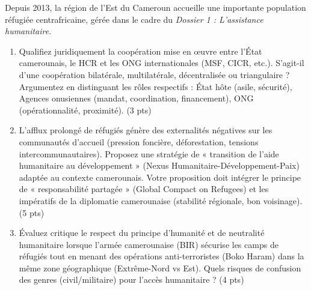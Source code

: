 \documentclass[11pt]{article}
\begin{document}
\begin{exercice}
Depuis 2013, la région de l'Est du Cameroun accueille une importante population réfugiée centrafricaine, gérée dans le cadre du \textit{Dossier 1 : L'assistance humanitaire}.
\begin{enumerate}
    \item Qualifiez juridiquement la coopération mise en œuvre entre l'État camerounais, le HCR et les ONG internationales (MSF, CICR, etc.). S'agit-il d'une coopération bilatérale, multilatérale, décentralisée ou triangulaire ? Argumentez en distinguant les rôles respectifs : État hôte (asile, sécurité), Agences onusiennes (mandat, coordination, financement), ONG (opérationnalité, proximité). (3 pts)
    \item L'afflux prolongé de réfugiés génère des externalités négatives sur les communautés d'accueil (pression foncière, déforestation, tensions intercommunautaires). Proposez une stratégie de « transition de l'aide humanitaire au développement » (Nexus Humanitaire-Développement-Paix) adaptée au contexte camerounais. Votre proposition doit intégrer le principe de « responsabilité partagée » (Global Compact on Refugees) et les impératifs de la diplomatie camerounaise (stabilité régionale, bon voisinage). (5 pts)
    \item Évaluez critique le respect du principe d'humanité et de neutralité humanitaire lorsque l'armée camerounaise (BIR) sécurise les camps de réfugiés tout en menant des opérations anti-terroristes (Boko Haram) dans la même zone géographique (Extrême-Nord vs Est). Quels risques de confusion des genres (civil/militaire) pour l'accès humanitaire ? (4 pts)
\end{enumerate}
\end{exercice}
\end{document}
